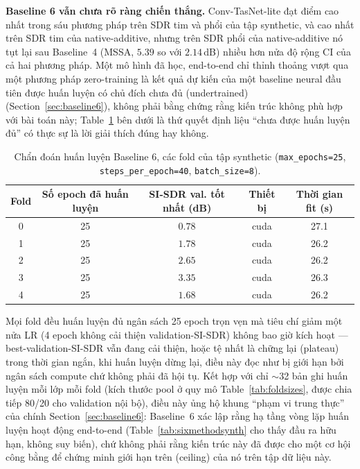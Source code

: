 \documentclass[11pt]{article}
\begin{document}
\textbf{Baseline 6 vẫn chưa rõ ràng chiến thắng.} Conv-TasNet-lite đạt
điểm cao nhất trong sáu phương pháp trên SDR tim và phổi của tập
synthetic, và cao nhất trên SDR tim của native-additive, nhưng trên SDR
phổi của native-additive nó tụt lại sau Baseline~4 (MSSA, $5.39$ so với
$2.14$\,dB) nhiều hơn nửa độ rộng CI của cả hai phương pháp. Một mô hình
đã học, end-to-end chỉ thỉnh thoảng vượt qua một phương pháp zero-training
là kết quả dự kiến của một baseline neural đầu tiên được huấn luyện có
chủ đích chưa đủ (undertrained) (Section~\ref{sec:baseline6}), không
phải bằng chứng rằng kiến trúc không phù hợp với bài toán này;
Table~\ref{tab:b6diag} bên dưới là thứ quyết định liệu ``chưa được huấn
luyện đủ'' có thực sự là lời giải thích đúng hay không.

\begin{table}[H]
\centering
\caption{Chẩn đoán huấn luyện Baseline 6, các fold của tập synthetic (\texttt{max\_epochs=25}, \texttt{steps\_per\_epoch=40}, \texttt{batch\_size=8}).}
\label{tab:b6diag}
\begin{tabular}{@{}ccccc@{}}
\toprule
Fold & Số epoch đã huấn luyện & SI-SDR val. tốt nhất (dB) & Thiết bị & Thời gian fit (s) \\
\midrule
0 & 25 & $0.78$ & cuda & 27.1 \\
1 & 25 & $1.78$ & cuda & 26.2 \\
2 & 25 & $2.65$ & cuda & 26.2 \\
3 & 25 & $3.35$ & cuda & 26.3 \\
4 & 25 & $1.68$ & cuda & 26.2 \\
\bottomrule
\end{tabular}
\end{table}

Mọi fold đều huấn luyện đủ ngân sách 25 epoch trọn vẹn mà tiêu chí giảm
một nửa LR (4 epoch không cải thiện validation-SI-SDR) không bao giờ
kích hoạt --- best-validation-SI-SDR vẫn đang cải thiện, hoặc tệ nhất là
chững lại (plateau) trong thời gian ngắn, khi huấn luyện dừng lại, điều
này đọc như bị giới hạn bởi ngân sách compute chứ không phải đã hội tụ.
Kết hợp với chỉ $\sim$32 bản ghi huấn luyện mỗi lớp mỗi fold (kích thước
pool ở quy mô Table~\ref{tab:foldsizes}, được chia tiếp 80/20 cho
validation nội bộ), điều này ủng hộ khung ``phạm vi trung thực'' của
chính Section~\ref{sec:baseline6}: Baseline~6 xác lập rằng hạ tầng vòng
lặp huấn luyện hoạt động end-to-end (Table~\ref{tab:sixmethodsynth} cho
thấy đầu ra hữu hạn, không suy biến), chứ không phải rằng kiến trúc này
đã được cho một cơ hội công bằng để chứng minh giới hạn trên (ceiling)
của nó trên tập dữ liệu này.
\end{document}
